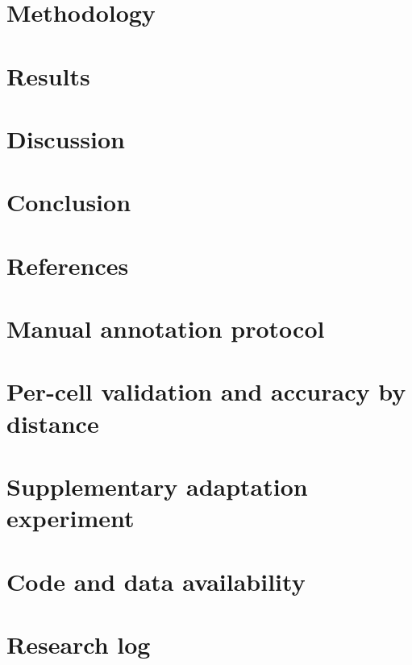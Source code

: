 \documentclass[12pt,a4paper,oneside]{report}
\begin{document}
\chapter{Methodology}
\chapter{Results}
\chapter{Discussion}
\chapter{Conclusion}

\chapter*{References}


\appendix
{}

\chapter{Manual annotation protocol}
\chapter{Per-cell validation and accuracy by distance}
\chapter{Supplementary adaptation experiment}
\chapter{Code and data availability}
\chapter{Research log}
\end{document}
